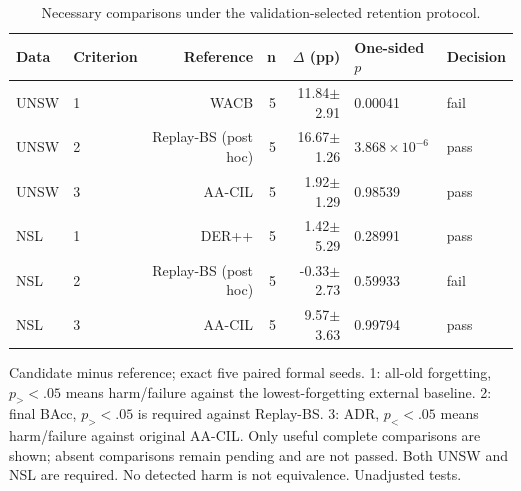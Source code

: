 \begin{table}[t]
\centering\scriptsize
\setlength{\tabcolsep}{3.8pt}
\caption{Necessary comparisons under the validation-selected retention protocol.}\label{tab:retention-necessary-tests}
\begin{tabular}{llrrrll}
\toprule
Data & Criterion & Reference & n & $\Delta$ (pp) & One-sided $p$ & Decision \\
\midrule
UNSW & 1 & WACB & 5 & 11.84$\pm$2.91 & 0.00041 & fail \\
UNSW & 2 & Replay-BS (post hoc) & 5 & 16.67$\pm$1.26 & $3.868\times10^{-6}$ & pass \\
UNSW & 3 & AA-CIL & 5 & 1.92$\pm$1.29 & 0.98539 & pass \\
NSL & 1 & DER++ & 5 & 1.42$\pm$5.29 & 0.28991 & pass \\
NSL & 2 & Replay-BS (post hoc) & 5 & -0.33$\pm$2.73 & 0.59933 & fail \\
NSL & 3 & AA-CIL & 5 & 9.57$\pm$3.63 & 0.99794 & pass \\
\bottomrule
\end{tabular}
\par\vspace{2pt}\begin{minipage}{.98\linewidth}\footnotesize Candidate minus reference; exact five paired formal seeds. 1: all-old forgetting, $p_{>}<.05$ means harm/failure against the lowest-forgetting external baseline. 2: final BAcc, $p_{>}<.05$ is required against Replay-BS. 3: ADR, $p_{<}<.05$ means harm/failure against original AA-CIL. Only useful complete comparisons are shown; absent comparisons remain pending and are not passed. Both UNSW and NSL are required. No detected harm is not equivalence. Unadjusted tests.\end{minipage}
\end{table}
